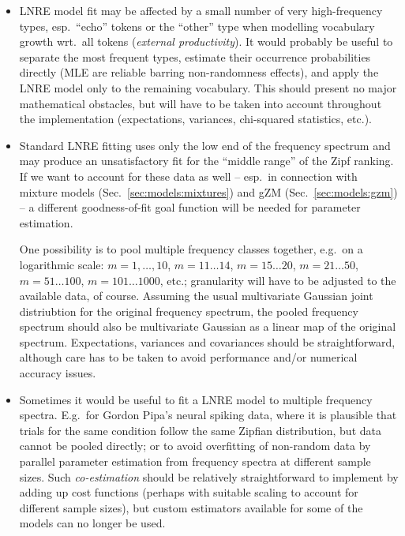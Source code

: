 \documentclass[a4paper]{article}
\begin{document}
\begin{itemize}

\item LNRE model fit may be affected by a small number of very high-frequency types, esp.\ ``echo'' tokens \citep{Baroni:Evert:07a} or the ``other'' type when modelling vocabulary growth wrt.\ all tokens (\emph{external productivity}).  It would probably be useful to separate the most frequent types, estimate their occurrence probabilities directly (MLE are reliable barring non-randomness effects), and apply the LNRE model only to the remaining vocabulary.  This should present no major mathematical obstacles, but will have to be taken into account throughout the implementation (expectations, variances, chi-squared statistics, etc.).

\item Standard LNRE fitting uses only the low end of the frequency spectrum and may produce an unsatisfactory fit for the ``middle range'' of the Zipf ranking.  If we want to account for these data as well -- esp.\ in connection with mixture models (Sec.~\ref{sec:models:mixtures}) and gZM (Sec.~\ref{sec:models:gzm}) -- a different goodness-of-fit goal function will be needed for parameter estimation.  

  One possibility is to pool multiple frequency classes together, e.g.\ on a logarithmic scale: $m=1,\ldots,10$, $m=11\ldots 14$, $m=15\ldots 20$, $m=21\ldots 50$, $m=51\ldots 100$, $m=101\ldots 1000$, etc.; granularity will have to be adjusted to the available data, of course.  Assuming the usual multivariate Gaussian joint distriubtion for the original frequency spectrum, the pooled frequency spectrum should also be multivariate Gaussian as a linear map of the original spectrum.  Expectations, variances and covariances should be straightforward, although care has to be taken to avoid performance and/or numerical accuracy issues.

\item Sometimes it would be useful to fit a LNRE model to multiple frequency spectra. E.g.\ for Gordon Pipa's neural spiking data, where it is plausible that trials for the same condition follow the same Zipfian distribution, but data cannot be pooled directly; or to avoid overfitting of non-random data by parallel parameter estimation from frequency spectra at different sample sizes.  Such \emph{co-estimation}  should be relatively straightforward to implement by adding up cost functions (perhaps with suitable scaling to account for different sample sizes), but custom estimators available for some of the models can no longer be used.


\end{itemize}
\end{document}
